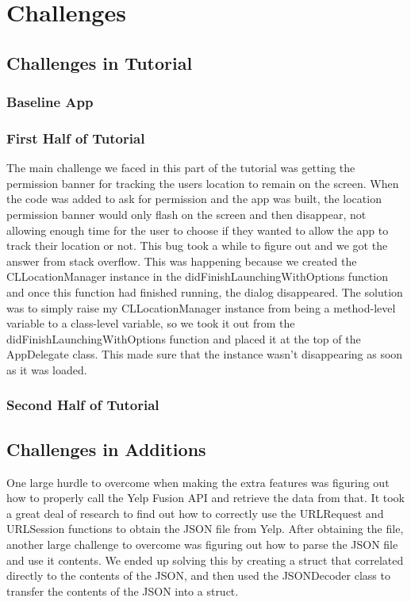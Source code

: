 \documentclass[conference]{IEEEtran}
\begin{document}
\section{Challenges}

\subsection{Challenges in Tutorial}
\subsubsection{Baseline App}
\subsubsection{First Half of Tutorial}
The main challenge we faced in this part of the tutorial was getting the permission banner for tracking the users location to remain on the screen. When the code was added to ask for permission and the app was built, the location permission banner would only flash on the screen and then disappear, not allowing enough time for the user to choose if they wanted to allow the app to track their location or not. This bug took a while to figure out and we got the answer from stack overflow. This was happening because we created the CLLocationManager instance in the didFinishLaunchingWithOptions function and once this function had finished running, the dialog disappeared. The solution was to simply raise my CLLocationManager instance from being a method-level variable to a class-level variable, so we took it out from the didFinishLaunchingWithOptions function and placed it at the top of the AppDelegate class. This made sure that the instance wasn't disappearing as soon as it was loaded. 
\subsubsection{Second Half of Tutorial}


\subsection{Challenges in Additions}
One large hurdle to overcome when making the extra features was figuring out how
to properly call the Yelp Fusion API and retrieve the data from that. It took a 
great deal of research to find out how to correctly use the URLRequest and URLSession
functions to obtain the JSON file from Yelp. After obtaining the file, another large
challenge to overcome was figuring out how to parse the JSON file and use it contents.
We ended up solving this by creating a struct that correlated directly to the contents
of the JSON, and then used the JSONDecoder class to transfer the contents of the 
JSON into a struct.
\end{document}
